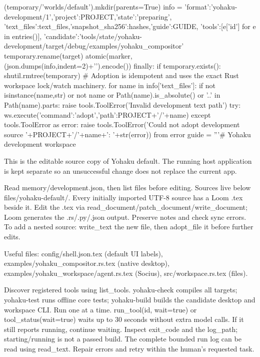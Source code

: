             (temporary/'worlds/default').mkdir(parents=True)
            info = {'format':'yohaku-development/1','project':PROJECT,'state':'preparing',
                    'text_files':text_files,'snapshot_sha256':hashes,'guide':GUIDE,
                    'tools':[e['id'] for e in entries()],
                    'candidate':'tools/state/yohaku-development/target/debug/examples/yohaku_compositor'}
            temporary.rename(target)
            atomic(marker, (json.dumps(info,indent=2)+'\n').encode())
        finally:
            if temporary.exists(): shutil.rmtree(temporary)
    # Adoption is idempotent and uses the exact Rust workspace lock/watch machinery.
    for name in info['text_files']:
        if not isinstance(name,str) or not name or Path(name).is_absolute() or '..' in Path(name).parts:
            raise tools.ToolError('Invalid development text path')
        try:
            ws.execute({'command':'adopt','path':PROJECT+'/'+name})
        except tools.ToolError as error:
            raise tools.ToolError('Could not adopt development source '+PROJECT+'/'+name+': '+str(error)) from error
    guide = '''# Yohaku development workspace

This is the editable source copy of Yohaku default. The running host application
is kept separate so an unsuccessful change does not replace the current app.

Read memory/development.json, then list files before editing. Sources live below
files/yohaku-default/. Every initially imported UTF-8 source has a Loom .tex
beside it. Edit the .tex via read_document/patch_document/write_document; Loom
generates the .rs/.py/.json output. Preserve notes and check sync errors. To add
a nested source: write_text the new file, then adopt_file it before further edits.

Useful files: config/shell.json.tex (default UI labels),
examples/yohaku_compositor.rs.tex (native desktop),
examples/yohaku_workspace/agent.rs.tex (Socius), src/workspace.rs.tex (files).

Discover registered tools using list_tools. yohaku-check compiles all targets;
yohaku-test runs offline core tests; yohaku-build builds the candidate desktop
and workspace CLI. Run one at a time. run_tool(id, wait=true) or
tool_status(wait=true) waits up to 30 seconds without extra model calls. If it
still reports running, continue waiting. Inspect exit_code and the log_path;
starting/running is not a passed build. The complete bounded run log can be read
using read_text. Repair errors and retry within the human's requested task.

